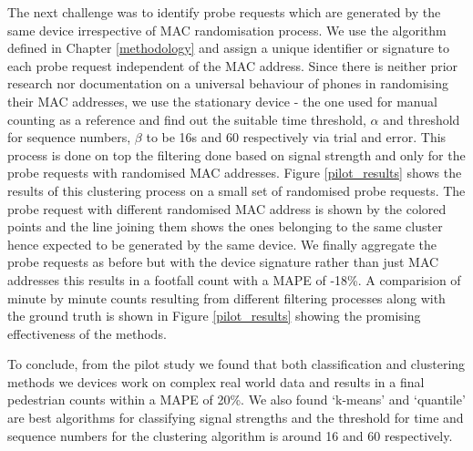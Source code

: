 The next challenge was to identify probe requests which are generated by the same device irrespective of MAC randomisation process.
We use the algorithm defined in Chapter \ref{methodology} and assign a unique identifier or signature to each probe request independent of the MAC address. 
Since there is neither prior research nor documentation on a universal behaviour of phones in randomising their MAC addresses, we use the stationary device - the one used for manual counting as a reference and find out the suitable time threshold, $\alpha$ and threshold for sequence numbers, $\beta$ to be 16s and 60 respectively via trial and error.
This process is done on top the filtering done based on signal strength and only for the probe requests with randomised MAC addresses.
Figure \ref{pilot_results} shows the results of this clustering process on a small set of randomised probe requests.
The probe request with different randomised MAC address is shown by the colored points and the line joining them shows the ones belonging to the same cluster hence expected to be generated by the same device.
We finally aggregate the probe requests as before but with the device signature rather than just MAC addresses this results in a footfall count with a MAPE of -18\%. 
A comparision of minute by minute counts resulting from different filtering processes along with the ground truth is shown in Figure \ref{pilot_results} showing the promising effectiveness of the methods.

To conclude, from the pilot study we found that both classification and clustering methods we devices work on complex real world data and results in a final pedestrian counts within a MAPE of 20\%. We also found `k-means' and `quantile' are best algorithms for classifying signal strengths and the threshold for time and sequence numbers for the clustering algorithm is around 16 and 60 respectively.

